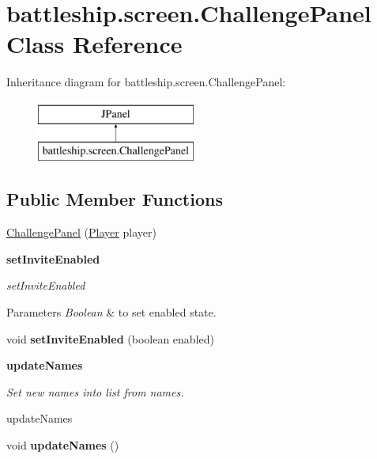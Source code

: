 \hypertarget{classbattleship_1_1screen_1_1ChallengePanel}{}\section{battleship.\+screen.\+Challenge\+Panel Class Reference}
\label{classbattleship_1_1screen_1_1ChallengePanel}
Inheritance diagram for battleship.\+screen.\+Challenge\+Panel\+:\begin{figure}[H]
\begin{center}
\leavevmode
\includegraphics[height=2.000000cm]{classbattleship_1_1screen_1_1ChallengePanel}
\end{center}
\end{figure}
\subsection*{Public Member Functions}
\begin{DoxyCompactItemize}
\item 
\hyperlink{classbattleship_1_1screen_1_1ChallengePanel_af00cb6020d791f7867c1f1e113cdcc29}{Challenge\+Panel} (\hyperlink{classbattleship_1_1game_1_1Player}{Player} player)
\end{DoxyCompactItemize}
\begin{Indent}{\bf set\+Invite\+Enabled}\par
{\em set\+Invite\+Enabled


\begin{DoxyParams}{Parameters}
{\em Boolean} & to set enabled state. \\
\hline
\end{DoxyParams}
}\begin{DoxyCompactItemize}
\item 
\hypertarget{classbattleship_1_1screen_1_1ChallengePanel_aa3a9f8baccccafb43a3fa9465ed27e13}{}void {\bfseries set\+Invite\+Enabled} (boolean enabled)\label{classbattleship_1_1screen_1_1ChallengePanel_aa3a9f8baccccafb43a3fa9465ed27e13}

\end{DoxyCompactItemize}
\end{Indent}
\begin{Indent}{\bf update\+Names}\par
{\em Set new names into list from names.

update\+Names }\begin{DoxyCompactItemize}
\item 
\hypertarget{classbattleship_1_1screen_1_1ChallengePanel_aaac7769c33686058c1b1d73f0b9f1d34}{}void {\bfseries update\+Names} ()\label{classbattleship_1_1screen_1_1ChallengePanel_aaac7769c33686058c1b1d73f0b9f1d34}

\end{DoxyCompactItemize}
\end{Indent}


